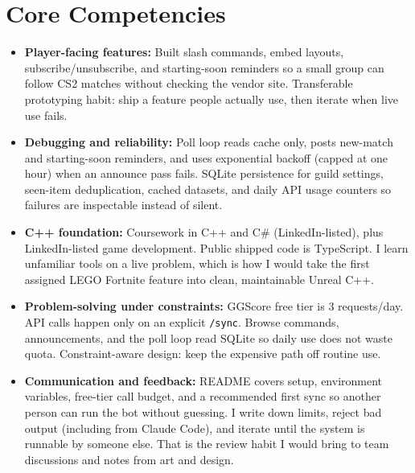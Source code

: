 \documentclass[11pt,a4paper,sans]{moderncv}
\begin{document}
\section{Core Competencies}
\vspace{1pt}
\begin{itemize}

\item \textbf{Player-facing features:} Built slash commands, embed layouts, subscribe/unsubscribe, and starting-soon reminders so a small group can follow CS2 matches without checking the vendor site. Transferable prototyping habit: ship a feature people actually use, then iterate when live use fails.

\item \textbf{Debugging and reliability:} Poll loop reads cache only, posts new-match and starting-soon reminders, and uses exponential backoff (capped at one hour) when an announce pass fails. SQLite persistence for guild settings, seen-item deduplication, cached datasets, and daily API usage counters so failures are inspectable instead of silent.

\item \textbf{C++ foundation:} Coursework in C++ and C\# (LinkedIn-listed), plus LinkedIn-listed game development. Public shipped code is TypeScript. I learn unfamiliar tools on a live problem, which is how I would take the first assigned LEGO Fortnite feature into clean, maintainable Unreal C++.

\item \textbf{Problem-solving under constraints:} GGScore free tier is 3 requests/day. API calls happen only on an explicit \texttt{/sync}. Browse commands, announcements, and the poll loop read SQLite so daily use does not waste quota. Constraint-aware design: keep the expensive path off routine use.

\item \textbf{Communication and feedback:} README covers setup, environment variables, free-tier call budget, and a recommended first sync so another person can run the bot without guessing. I write down limits, reject bad output (including from Claude Code), and iterate until the system is runnable by someone else. That is the review habit I would bring to team discussions and notes from art and design.

\end{itemize}

\end{document}

